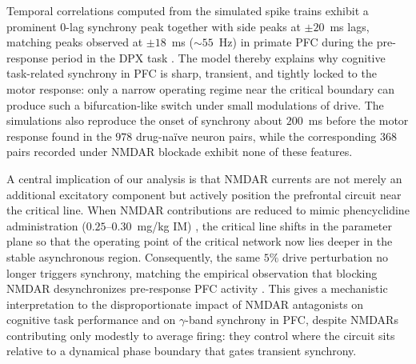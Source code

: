 \documentclass[11pt]{article}
\begin{document}
Temporal correlations computed from the simulated spike trains exhibit a prominent $0$-lag synchrony peak together with side peaks at $\pm 20$~ms lags, matching peaks observed at $\pm 18$~ms ($\sim 55$~Hz) in primate PFC during the pre-response period in the DPX task \citep{zick2018differential}. The model thereby explains why cognitive task-related synchrony in PFC is sharp, transient, and tightly locked to the motor response: only a narrow operating regime near the critical boundary can produce such a bifurcation-like switch under small modulations of drive. The simulations also reproduce the onset of synchrony about $200$~ms before the motor response found in the $978$ drug-na\"ive neuron pairs, while the corresponding $368$ pairs recorded under NMDAR blockade exhibit none of these features.

A central implication of our analysis is that NMDAR currents are not merely an additional excitatory component but actively position the prefrontal circuit near the critical line. When NMDAR contributions are reduced to mimic phencyclidine administration ($0.25$--$0.30$~mg/kg IM) \citep{javitt1991recent,krystal1994subanesthetic}, the critical line shifts in the parameter plane so that the operating point of the critical network now lies deeper in the stable asynchronous region. Consequently, the same $5\%$ drive perturbation no longer triggers synchrony, matching the empirical observation that blocking NMDAR desynchronizes pre-response PFC activity \citep{zick2018differential,homayoun2007nmda}. This gives a mechanistic interpretation to the disproportionate impact of NMDAR antagonists on cognitive task performance and on $\gamma$-band synchrony in PFC, despite NMDARs contributing only modestly to average firing: they control where the circuit sits relative to a dynamical phase boundary that gates transient synchrony.
\end{document}
